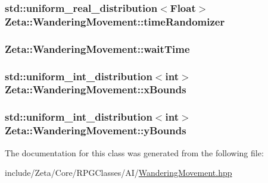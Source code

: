 \hypertarget{classZeta_1_1WanderingMovement_adf4cc859f2b1bf25264282b67a4f31cf}{
\subsubsection[{time\+Randomizer}]{\setlength{\rightskip}{0pt plus 5cm}std\+::uniform\+\_\+real\+\_\+distribution$<${\bf Float}$>$ Zeta\+::\+Wandering\+Movement\+::time\+Randomizer\hspace{0.3cm}{\ttfamily [private]}}}\label{classZeta_1_1WanderingMovement_adf4cc859f2b1bf25264282b67a4f31cf}
\hypertarget{classZeta_1_1WanderingMovement_ab6b10c55a9ef6c5f0714f88634401a37}{
\subsubsection[{wait\+Time}]{ Zeta\+::\+Wandering\+Movement\+::wait\+Time\hspace{0.3cm}{\ttfamily [private]}}}\label{classZeta_1_1WanderingMovement_ab6b10c55a9ef6c5f0714f88634401a37}
\hypertarget{classZeta_1_1WanderingMovement_acf82ca048daf641c7e961495d549fe20}{
\subsubsection[{x\+Bounds}]{\setlength{\rightskip}{0pt plus 5cm}std\+::uniform\+\_\+int\+\_\+distribution$<$int$>$ Zeta\+::\+Wandering\+Movement\+::x\+Bounds\hspace{0.3cm}{\ttfamily [private]}}}\label{classZeta_1_1WanderingMovement_acf82ca048daf641c7e961495d549fe20}
\hypertarget{classZeta_1_1WanderingMovement_a860655a4bedc3d86b8d73409fa0a51b8}{
\subsubsection[{y\+Bounds}]{\setlength{\rightskip}{0pt plus 5cm}std\+::uniform\+\_\+int\+\_\+distribution$<$int$>$ Zeta\+::\+Wandering\+Movement\+::y\+Bounds\hspace{0.3cm}{\ttfamily [private]}}}\label{classZeta_1_1WanderingMovement_a860655a4bedc3d86b8d73409fa0a51b8}


The documentation for this class was generated from the following file\+:\begin{DoxyCompactItemize}
\item 
include/\+Zeta/\+Core/\+R\+P\+G\+Classes/\+A\+I/\hyperlink{WanderingMovement_8hpp}{Wandering\+Movement.\+hpp}\end{DoxyCompactItemize}
